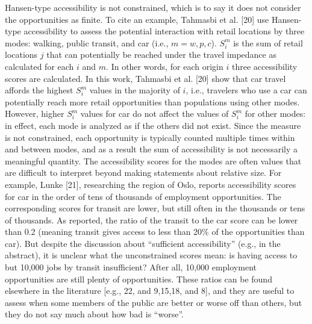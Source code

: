 \documentclass[10pt,letterpaper]{article}
\begin{document}
Hansen-type accessibility is not constrained, which is to say it does
not consider the opportunities as finite. To cite an example, Tahmasbi
et al. {[}20{]} use Hansen-type accessibility to assess the potential
interaction with retail locations by three modes: walking, public
transit, and car (i.e., \(m = w, p, c\)). \(S_i^m\) is the sum of retail
locations \(j\) that can potentially be reached under the travel
impedance as calculated for each \(i\) and \(m\). In other words, for
each origin \(i\) three accessibility scores are calculated. In this
work, Tahmasbi et al. {[}20{]} show that car travel affords the highest
\(S_i^{m}\) values in the majority of \(i\), i.e., travelers who use a
car can potentially reach more retail opportunities than populations
using other modes. However, higher \(S_i^{m}\) values for car do not
affect the values of \(S_i^{m}\) for other modes: in effect, each mode
is analyzed as if the others did not exist. Since the measure is not
constrained, each opportunity is typically counted multiple times within
and between modes, and as a result the sum of accessibility is not
necessarily a meaningful quantity. The accessibility scores for the
modes are often values that are difficult to interpret beyond making
statements about relative size. For example, Lunke {[}21{]}, researching
the region of Oslo, reports accessibility scores for car in the order of
tens of thousands of employment opportunities. The corresponding scores
for transit are lower, but still often in the thousands or tens of
thousands. As reported, the ratio of the transit to the car score can be
lower than 0.2 (meaning transit gives access to less than 20\% of the
opportunities than car). But despite the discussion about ``sufficient
accessibility'' (e.g., in the abstract), it is unclear what the
unconstrained scores mean: is having access to but 10,000 jobs by
transit insufficient? After all, 10,000 employment opportunities are
still plenty of opportunities. These ratios can be found elsewhere in
the literature {[}e.g., 22, and 9,15,18, and 8{]}, and they are useful
to assess when some members of the public are better or worse off than
others, but they do not say much about how bad is ``worse''.
\end{document}
